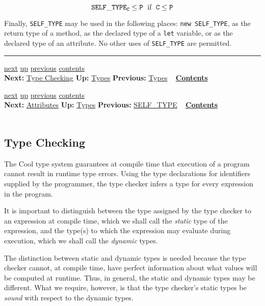 \documentclass[]{article}
\begin{document}
\begin{displaymath}\tt {\tt SELF\_TYPE}_C \leq P \;\mbox {\rm\ if\ }\; C \leq P \end{displaymath}

Finally, \texttt{SELF\_TYPE} may be used in the following places:
\texttt{new SELF\_TYPE}, as the return type of a method, as the declared
type of a \texttt{let} variable, or as the declared type of an
attribute. No other uses of \texttt{SELF\_TYPE} are permitted.

\begin{center}\rule{3in}{0.4pt}\end{center}

\href{node9.html}{next} \href{node7.html}{up}
\href{node7.html}{previous} \href{node1.html}{contents} \\
\textbf{Next:} \href{node9.html}{Type Checking} \textbf{Up:}
\href{node7.html}{Types} \textbf{Previous:} \href{node7.html}{Types} ~
\textbf{\href{node1.html}{Contents}}

\href{node10.html}{next} \href{node7.html}{up}
\href{node8.html}{previous} \href{node1.html}{contents} \\
\textbf{Next:} \href{node10.html}{Attributes} \textbf{Up:}
\href{node7.html}{Types} \textbf{Previous:}
\href{node8.html}{SELF\_TYPE} ~ \textbf{\href{node1.html}{Contents}} \\
\\

\subsection{Type Checking}

The Cool type system guarantees at compile time that execution of a
program cannot result in runtime type errors. Using the type
declarations for identifiers supplied by the programmer, the type
checker infers a type for every expression in the program.

It is important to distinguish between the type assigned by the type
checker to an expression at compile time, which we shall call the
\emph{static} type of the expression, and the type(s) to which the
expression may evaluate during execution, which we shall call the
\emph{dynamic} types.

The distinction between static and dynamic types is needed because the
type checker cannot, at compile time, have perfect information about
what values will be computed at runtime. Thus, in general, the static
and dynamic types may be different. What we require, however, is that
the type checker's static types be \emph{sound} with respect to the
dynamic types.
\end{document}
